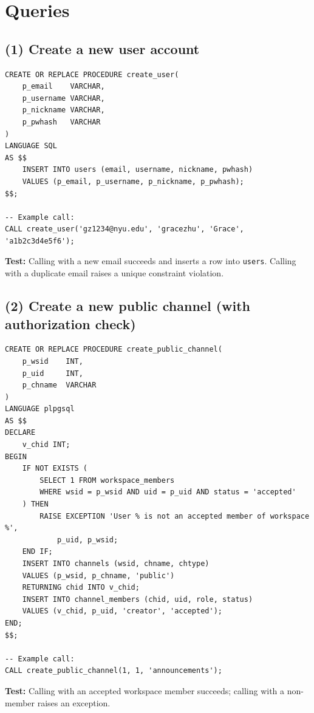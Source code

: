 \documentclass[11pt]{article}
\begin{document}
\newpage
\section{Queries}
\label{sec:queries}

\subsection{(1) Create a new user account}

\begin{lstlisting}
CREATE OR REPLACE PROCEDURE create_user(
    p_email    VARCHAR,
    p_username VARCHAR,
    p_nickname VARCHAR,
    p_pwhash   VARCHAR
)
LANGUAGE SQL
AS $$
    INSERT INTO users (email, username, nickname, pwhash)
    VALUES (p_email, p_username, p_nickname, p_pwhash);
$$;

-- Example call:
CALL create_user('gz1234@nyu.edu', 'gracezhu', 'Grace', 'a1b2c3d4e5f6');
\end{lstlisting}

\noindent\textbf{Test:} Calling with a new email succeeds and inserts a row into \texttt{users}. Calling with a duplicate email raises a unique constraint violation.

\subsection{(2) Create a new public channel (with authorization check)}

\begin{lstlisting}
CREATE OR REPLACE PROCEDURE create_public_channel(
    p_wsid    INT,
    p_uid     INT,
    p_chname  VARCHAR
)
LANGUAGE plpgsql
AS $$
DECLARE
    v_chid INT;
BEGIN
    IF NOT EXISTS (
        SELECT 1 FROM workspace_members
        WHERE wsid = p_wsid AND uid = p_uid AND status = 'accepted'
    ) THEN
        RAISE EXCEPTION 'User % is not an accepted member of workspace %',
            p_uid, p_wsid;
    END IF;
    INSERT INTO channels (wsid, chname, chtype)
    VALUES (p_wsid, p_chname, 'public')
    RETURNING chid INTO v_chid;
    INSERT INTO channel_members (chid, uid, role, status)
    VALUES (v_chid, p_uid, 'creator', 'accepted');
END;
$$;

-- Example call:
CALL create_public_channel(1, 1, 'announcements');
\end{lstlisting}

\noindent\textbf{Test:} Calling with an accepted workspace member succeeds; calling with a non-member raises an exception.
\end{document}
